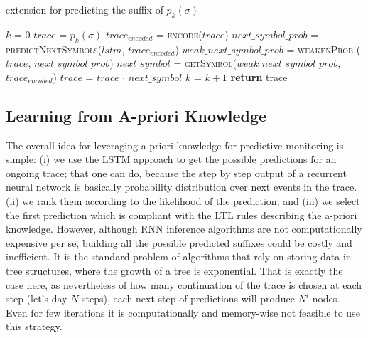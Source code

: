 \begin{algorithm}
	\caption{\nocycle extension for predicting the suffix of $p_k(\sigma)$}
	\begin{algorithmic}[1]
		\State $k$ = 0
		\State $trace$ = $p_k(\sigma)$
		\Do
		\State $trace_{encoded}$ = \textsc{encode}($trace$)
		\State $next\_symbol\_prob$ = \textsc{predictNextSymbols}($lstm$, $trace_{encoded}$)
		\State $weak\_next\_symbol\_prob$ = \textsc{weakenProb} ($trace$, $next\_symbol\_prob$)
		\State $next\_symbol$ = \textsc{getSymbol}($weak\_next\_symbol\_prob$, $trace_{encoded}$)
		\State $trace$ = $trace$ $\cdot$ $next\_symbol$
		\State $k$ = $k + 1$
		\State \textbf{return} trace
		\EndFunction
		

	\end{algorithmic}
	\label{alg:nocycle}
\end{algorithm}


\subsection{Learning from A-priori Knowledge}
\label{ssec:apriori}

The overall idea for leveraging a-priori knowledge for predictive monitoring is simple: (i) we use the LSTM approach to get the possible predictions for an ongoing trace; that one can do, because the step by step output of a recurrent neural network is basically probability distribution over next events in the trace. (ii) we rank them according to the likelihood of the prediction; and (iii) we select the first prediction which is compliant with the LTL rules describing the a-priori knowledge. However, although RNN inference algorithms are not computationally expensive per se, building all the possible predicted suffixes could be costly and inefficient. It is the standard problem of algorithms that rely on storing data in tree structures, where the growth of a tree is exponential. That is exactly the case here, as nevertheless of how many continuation of the trace is chosen at each step (let's day $N$ steps), each next step of predictions will produce $N^{i}$ nodes. Even for few iterations it is computationally and memory-wise not feasible to use this strategy.

